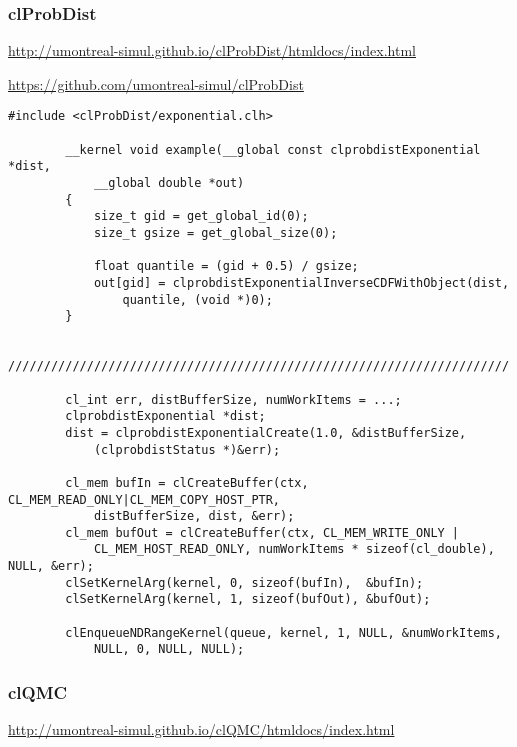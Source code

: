             \subsubsection{clProbDist}
            \url{http://umontreal-simul.github.io/clProbDist/htmldocs/index.html}
			
            \url{https://github.com/umontreal-simul/clProbDist}
            \begin{lstlisting}[caption=clProbDist Beispiel]
        #include <clProbDist/exponential.clh>                             
                                                                          
        __kernel void example(__global const clprobdistExponential *dist, 
            __global double *out)                       
        {                                                        
            size_t gid = get_global_id(0);                                   
            size_t gsize = get_global_size(0);                               
				
            float quantile = (gid + 0.5) / gsize;                        
            out[gid] = clprobdistExponentialInverseCDFWithObject(dist, 
                quantile, (void *)0); 
        } 
		 
        //////////////////////////////////////////////////////////////////////
			
        cl_int err, distBufferSize, numWorkItems = ...;
        clprobdistExponential *dist;
        dist = clprobdistExponentialCreate(1.0, &distBufferSize, 
            (clprobdistStatus *)&err);    
			
        cl_mem bufIn = clCreateBuffer(ctx, CL_MEM_READ_ONLY|CL_MEM_COPY_HOST_PTR, 
            distBufferSize, dist, &err);
        cl_mem bufOut = clCreateBuffer(ctx, CL_MEM_WRITE_ONLY | 
            CL_MEM_HOST_READ_ONLY, numWorkItems * sizeof(cl_double), NULL, &err);
        clSetKernelArg(kernel, 0, sizeof(bufIn),  &bufIn);
        clSetKernelArg(kernel, 1, sizeof(bufOut), &bufOut);
			
        clEnqueueNDRangeKernel(queue, kernel, 1, NULL, &numWorkItems, 
            NULL, 0, NULL, NULL);		
            \end{lstlisting}
			
            \subsubsection{clQMC}
            \url{http://umontreal-simul.github.io/clQMC/htmldocs/index.html}
			

